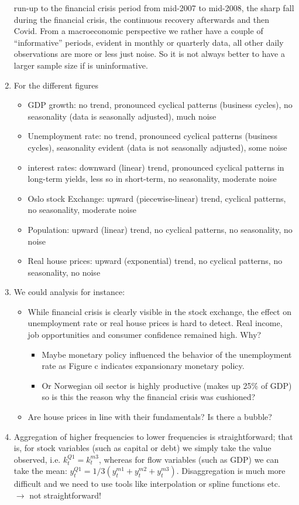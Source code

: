 \begin{enumerate}
  run-up to the financial crisis period from mid-2007 to mid-2008,
  the sharp fall during the financial crisis,
  the continuous recovery afterwards
  and then Covid.
From a macroeconomic perspective we rather have a couple of \enquote{informative} periods, evident in monthly or quarterly data,
  all other daily observations are more or less just noise.
So it is not always better to have a larger sample size if is uninformative.
\item For the different figures
\begin{itemize}
    \item GDP growth: no trend, pronounced cyclical patterns (business cycles), no seasonality (data is seasonally adjusted), much noise
    \item Unemployment rate: no trend, pronounced cyclical patterns (business cycles), seasonality evident (data is not seasonally adjusted), some noise
    \item interest rates: downward (linear) trend, pronounced cyclical patterns in long-term yields, less so in short-term, no seasonality, moderate noise
    \item Oslo stock Exchange: upward (piecewise-linear) trend, cyclical patterns, no seasonality, moderate noise
    \item Population: upward (linear) trend, no cyclical patterns, no seasonality, no noise
    \item Real house prices: upward (exponential) trend, no cyclical patterns, no seasonality, no noise
\end{itemize}
\item We could analysis for instance:
    \begin{itemize}
        \item While financial crisis is clearly visible in the stock exchange,
          the effect on unemployment rate or real house prices is hard to detect.
        Real income, job opportunities and consumer confidence remained high. Why?
        \begin{itemize} 
            \item Maybe monetary policy influenced the behavior of the unemployment rate as Figure c indicates expansionary monetary policy.
            \item Or Norwegian oil sector is highly productive (makes up 25\% of GDP) so is this the reason why the financial crisis was cushioned?
        \end{itemize}
        \item Are house prices in line with their fundamentals? Is there a bubble?
    \end{itemize}
\item Aggregation of higher frequencies to lower frequencies is straightforward;
  that is, for stock variables (such as capital or debt) we simply take the value observed, i.e. $k_t^{Q1} = k_t^{m3}$,
  whereas for flow variables (such as GDP) we can take the mean: $y_t^{Q1} = 1/3 (y_t^{m1}+y_t^{m2}+y_t^{m3})$.
Disaggregation is much more difficult and we need to use tools like interpolation or spline functions etc. $\rightarrow$ not straightforward!
\end{enumerate}
